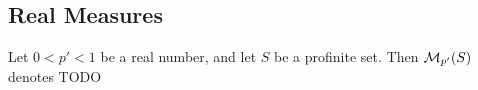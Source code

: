 \subsection{Real Measures}

\begin{definition}
  \label{real-measures}
  \leanok
  Let $0 < p' < 1$ be a real number, and let $S$ be a profinite set.
  Then $\mathcal M_{p'}(S)$ denotes TODO
\end{definition}
